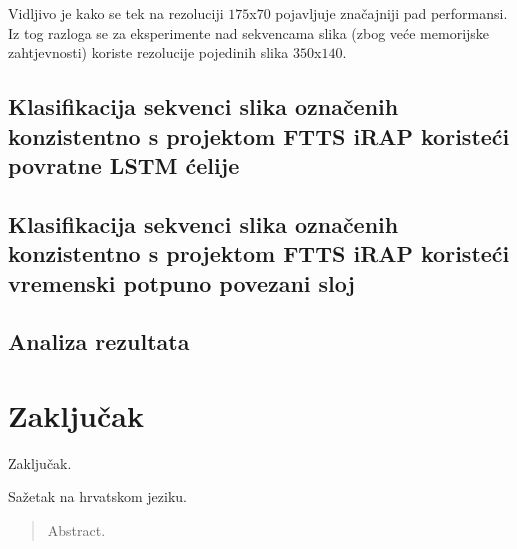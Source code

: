 \documentclass[times, utf8, diplomski, numeric]{fer}
\begin{document}
Vidljivo je kako se tek na rezoluciji $175$x$70$ pojavljuje značajniji pad performansi. 
Iz tog razloga se za eksperimente nad sekvencama slika (zbog veće memorijske zahtjevnosti) koriste rezolucije pojedinih slika $350$x$140$.

\section{Klasifikacija sekvenci slika označenih konzistentno s projektom FTTS iRAP koristeći povratne LSTM ćelije}

\section{Klasifikacija sekvenci slika označenih konzistentno s projektom FTTS iRAP koristeći vremenski potpuno povezani sloj}

\section{Analiza rezultata}

\chapter{Zaključak}
Zaključak.




\begin{sazetak}
Sažetak na hrvatskom jeziku.

\end{sazetak}

\begin{abstract}
Abstract.

\end{abstract}
\end{document}
